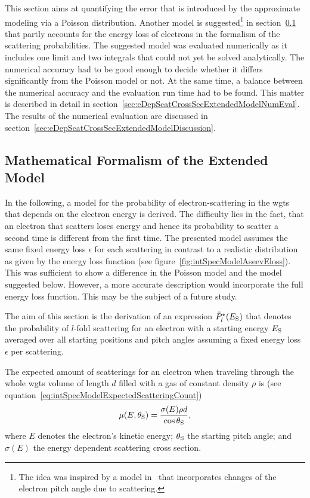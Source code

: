 This section aims at quantifying the error that is introduced by the approximate modeling via a Poisson distribution. Another model is suggested\footnote{The idea was inspired by a model in~\cite{Groh2015} that incorporates changes of the electron pitch angle due to scattering.} in section~\ref{sec:eDepScatCrossSecExtendedModelFormalism} that partly accounts for the energy loss of electrons in the formalism of the scattering probabilities. The suggested model was evaluated numerically as it includes one limit and two integrals that could not yet be solved analytically. The numerical accuracy had to be good enough to decide whether it differs significantly from the Poisson model or not. At the same time, a balance between the numerical accuracy and the evaluation run time had to be found. This matter is described in detail in section~\ref{sec:eDepScatCrossSecExtendedModelNumEval}. The results of the numerical evaluation are discussed in section~\ref{sec:eDepScatCrossSecExtendedModelDiscussion}.

\subsection{Mathematical Formalism of the Extended Model}
\label{sec:eDepScatCrossSecExtendedModelFormalism}
In the following, a model for the probability of electron-scattering in the \gls{wgts} that depends on the electron energy is derived. The difficulty lies in the fact, that an electron that scatters loses energy and hence its probability to scatter a second time is different from the first time. The presented model assumes the same fixed energy loss $\epsilon$ for each scattering in contrast to a realistic distribution as given by the energy loss function (see figure~\ref{fig:intSpecModelAseevEloss}). This was sufficient to show a difference in the Poisson model and the model suggested below. However, a more accurate description would incorporate the full energy loss function. This may be the subject of a future study. 

The aim of this section is the derivation of an expression $\bar{P}^{\star}_l(E_\mathrm{S})$ that denotes the probability of $l$-fold scattering for an electron with a starting energy $E_\mathrm{S}$ averaged over all starting positions and pitch angles assuming a fixed energy loss $\epsilon$ per scattering.

The expected amount of scatterings for an electron when traveling through the whole \gls{wgts} volume of length $d$ filled with a gas of constant density $\rho$ is (see equation~\ref{eq:intSpecModelExpectedScatteringCount})
\begin{equation}
\mu(E,\theta_\mathrm{S}) =
\frac{\sigma(E)\rho d}{\cos\theta_\mathrm{S}},
\end{equation}
where $E$ denotes the electron's kinetic energy; $\theta_\mathrm{S}$ the starting pitch angle; and $\sigma(E)$ the energy dependent scattering cross section.

